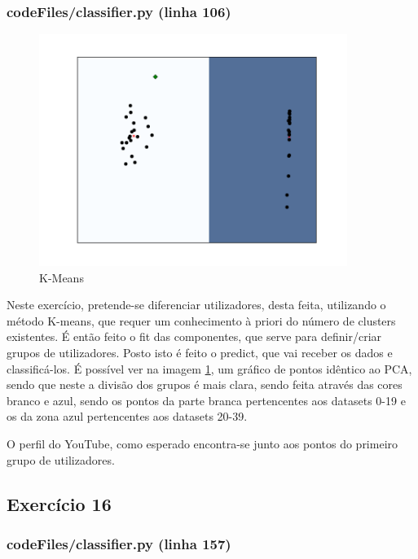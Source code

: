 \documentclass[pdftex,12pt,a4paper]{report}
\begin{document}
\subsubsection{codeFiles/classifier.py (linha 106)}

\begin{figure}[!htb]
\center
 \includegraphics[width=100mm,scale=1]{classifier/K_means.png}
 \caption{K-Means}
 \label{fig:k_means}
\end{figure}

Neste exercício, pretende-se diferenciar utilizadores, desta feita, utilizando o método K-means, que requer um conhecimento à priori do número de clusters existentes. É então feito o fit das componentes, que serve para definir/criar grupos de utilizadores. Posto isto é feito o predict, que vai receber os dados e classificá-los. É possível ver na imagem \ref{fig:k_means}, um gráfico de pontos idêntico ao PCA, sendo que neste a divisão dos grupos é mais clara, sendo feita através das cores branco e azul, sendo os pontos da parte branca pertencentes aos datasets 0-19 e os da zona azul pertencentes aos datasets 20-39. 

O perfil do YouTube, como esperado encontra-se junto aos pontos do primeiro grupo de utilizadores.

\newpage
\subsection{Exercício 16}
\subsubsection{codeFiles/classifier.py (linha 157)}
\end{document}
